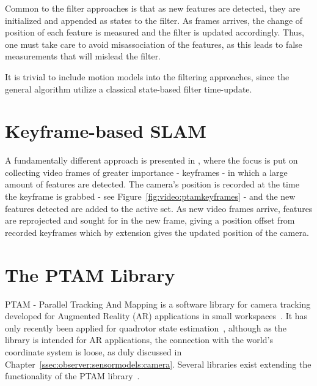         Common to the filter approaches is that as new features are detected,
        they are initialized and appended as states to the filter.
        As frames arrives, the change of position of each feature is measured and
        the filter is updated accordingly.
        Thus, one must take care to avoid misassociation of the features, as
        this leads to false measurements that will mislead the filter.

        It is trivial to include motion models into the filtering approaches, since
        the general algorithm utilize a classical state-based filter time-update.

    \section{Keyframe-based SLAM}
        A fundamentally different approach is presented in \citep{klein07parallel},
        where the focus is put on collecting video frames of greater importance - keyframes -
        in which a large amount of features are detected.
        The camera's position is recorded at the time the keyframe is grabbed - see Figure~\ref{fig:video:ptamkeyframes} -
        and the new features detected are added to the active set.
        As new video frames arrive, features are reprojected and sought for in
        the new frame, giving a position offset from recorded keyframes which by
        extension gives the updated position of the camera.


    \section{The PTAM Library}
        PTAM - Parallel Tracking And Mapping is a software library for camera tracking
        developed for Augmented Reality (AR) applications in small workspaces~\citep{klein07parallel}.
        It has only recently been applied for quadrotor state estimation~\citep{weiss11monocular},
        although as the library is intended for AR applications, the connection
        with the world's coordinate system is loose, as duly discussed in Chapter~\ref{ssec:observer:sensormodels:camera}.
        Several libraries exist extending the functionality of the PTAM library~\citep{Nguyen_Sandor_Park_2010}.

